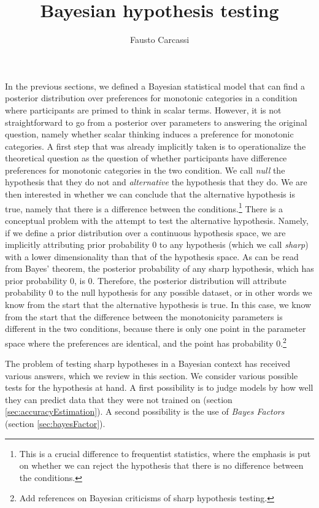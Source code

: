 \documentclass[a4paper,12pt,twoside]{article}
\title{Bayesian hypothesis testing}
\author{Fausto Carcassi}
\begin{document}
\maketitle

In the previous sections, we defined a Bayesian statistical model that can find a posterior distribution over preferences for monotonic categories in a condition where participants are primed to think in scalar terms. However, it is not straightforward to go from a posterior over parameters to answering the original question, namely whether scalar thinking induces a preference for monotonic categories. A first step that was already implicitly taken is to operationalize the theoretical question as the question of whether participants have difference preferences for monotonic categories in the two condition. We call \textit{null} the hypothesis that they do not and \textit{alternative} the hypothesis that they do. We are then interested in whether we can conclude that the alternative hypothesis is true, namely that there is a difference between the conditions.\footnote{This is a crucial difference to frequentist statistics, where the emphasis is put on whether we can reject the hypothesis that there is no difference between the conditions.} There is a conceptual problem with the attempt to test the alternative hypothesis. Namely, if we define a prior distribution over a continuous hypothesis space, we are implicitly attributing prior probability 0 to any hypothesis (which we call \textit{sharp}) with a lower dimensionality than that of the hypothesis space. As can be read from Bayes' theorem, the posterior probability of any sharp hypothesis, which has prior probability 0, is 0. Therefore, the posterior distribution will attribute probability 0 to the null hypothesis for any possible dataset, or in other words we know from the start that the alternative hypothesis is true. In this case, we know from the start that the difference between the monotonicity parameters is different in the two conditions, because there is only one point in the parameter space where the preferences are identical, and the point has probability 0.\footnote{Add references on Bayesian criticisms of sharp hypothesis testing.}

The problem of testing sharp hypotheses in a Bayesian context has received various answers, which we review in this section. We consider various possible tests for the hypothesis at hand. A first possibility is to judge models by how well they can predict data that they were not trained on (section \ref{sec:accuracyEstimation}). A second possibility is the use of \textit{Bayes Factors} (section \ref{sec:bayesFactor}).
\end{document}
